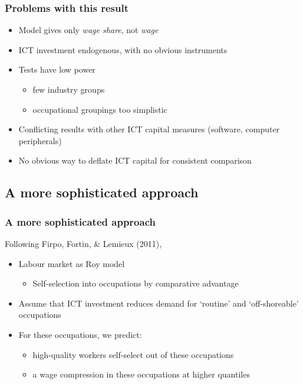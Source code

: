 \documentclass[red]{beamer}
\newcommand{\vitem}{\vfill\item}
\begin{document}
\begin{frame}[c]
  \frametitle{Problems with this result}
  \begin{itemize}
    \vitem Model gives only {\em wage share}, not {\em wage}
    \vitem ICT investment endogenous, with no obvious instruments
    \vitem Tests have low power
    \begin{itemize}
      \item few industry groups
      \item occupational groupings too simplistic
    \end{itemize}
    \vitem Conflicting results with other ICT capital measures 
           (software, computer peripherals)
    \vitem No obvious way to deflate ICT capital for consistent comparison
  \end{itemize}
\end{frame}

\subsection{A more sophisticated approach}
\begin{frame}
  \frametitle{A more sophisticated approach}
  Following Firpo, Fortin, \& Lemieux (2011),
  \begin{itemize}
  \vitem Labour market as Roy model
    \begin{itemize}
    \item Self-selection into occupations by comparative advantage
    \end{itemize}
  \vitem Assume that ICT investment reduces demand for `routine' and `off-shoreable' occupations
  \vitem For these occupations, we predict:
    \begin{itemize}
    \item high-quality workers self-select out of these occupations
    \item a wage compression in these occupations at higher quantiles
    \end{itemize}
  \end{itemize}
\end{frame}
\end{document}

